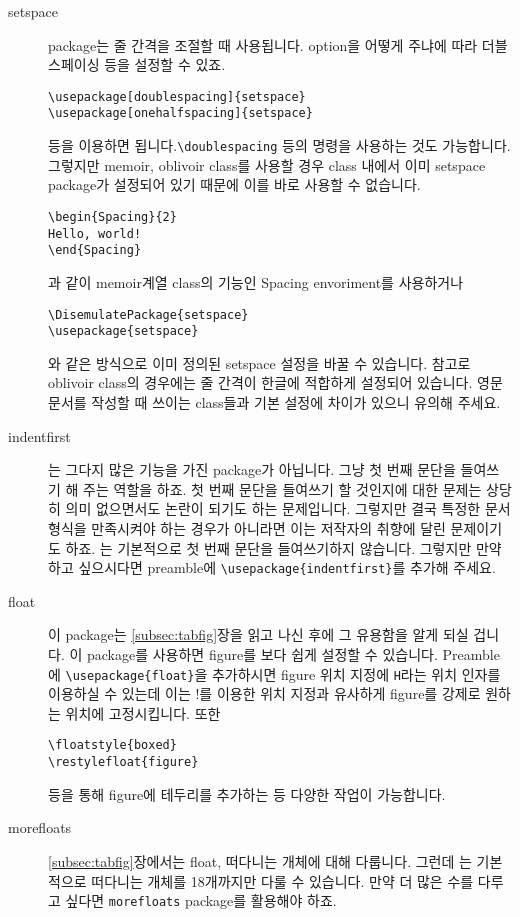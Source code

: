 \begin{description}
\item[setspace] package는 줄 간격을 조절할 때 사용됩니다. option을 어떻게 주냐에 따라 더블스페이싱 등을 설정할 수 있죠.
\begin{Verbatim}
\usepackage[doublespacing]{setspace}  \usepackage[onehalfspacing]{setspace}
\end{Verbatim}
등을 이용하면 됩니다.\verb|\doublespacing| 등의 명령을 사용하는 것도 가능합니다. 그렇지만 memoir, oblivoir class를 사용할 경우 class 내에서 이미 setspace package가 설정되어 있기 때문에 이를 바로 사용할 수 없습니다.
\begin{Verbatim}
\begin{Spacing}{2}
Hello, world!
\end{Spacing}
\end{Verbatim}
과 같이 memoir계열 class의 기능인 Spacing envoriment를 사용하거나
\begin{Verbatim}
\DisemulatePackage{setspace}
\usepackage{setspace}
\end{Verbatim}
와 같은 방식으로 이미 정의된 setspace 설정을 바꿀 수 있습니다.
참고로 oblivoir class의 경우에는 줄 간격이 한글에 적합하게 설정되어 있습니다.
영문 문서를 작성할 때 쓰이는  class들과 기본 설정에 차이가 있으니 유의해 주세요.
\item[indentfirst] 는 그다지 많은 기능을 가진 package가 아닙니다. 그냥 첫 번째 문단을 들여쓰기 해 주는 역할을 하죠. 첫 번째 문단을 들여쓰기 할 것인지에 대한 문제는 상당히 의미 없으면서도 논란이 되기도 하는 문제입니다. 그렇지만 결국 특정한 문서 형식을 만족시켜야 하는 경우가 아니라면 이는 저작자의 취향에 달린 문제이기도 하죠. \lt 는 기본적으로 첫 번째 문단을 들여쓰기하지 않습니다. 그렇지만 만약 하고 싶으시다면 preamble에 \verb|\usepackage{indentfirst}|를 추가해 주세요.

\item[float] 이 package는 \ref{subsec:tabfig}장을 읽고 나신 후에 그 유용함을 알게 되실 겁니다. 이 package를 사용하면 figure를 보다 쉽게 설정할 수 있습니다. Preamble에 \verb|\usepackage{float}|을 추가하시면 figure 위치 지정에 \verb|H|라는 위치 인자를 이용하실 수 있는데 이는 !를 이용한 위치 지정과 유사하게 figure를 강제로 원하는 위치에 고정시킵니다. 또한
\begin{Verbatim}
\floatstyle{boxed}
\restylefloat{figure}
\end{Verbatim}
등을 통해 figure에 테두리를 추가하는 등 다양한 작업이 가능합니다.

\item[morefloats] \ref{subsec:tabfig}장에서는 float, 떠다니는 개체에 대해 다룹니다. 그런데 \lt 는 기본적으로 떠다니는 개체를 18개까지만 다룰 수 있습니다. 만약 더 많은 수를 다루고 싶다면 \verb|morefloats| package를 활용해야 하죠.
\end{description}

